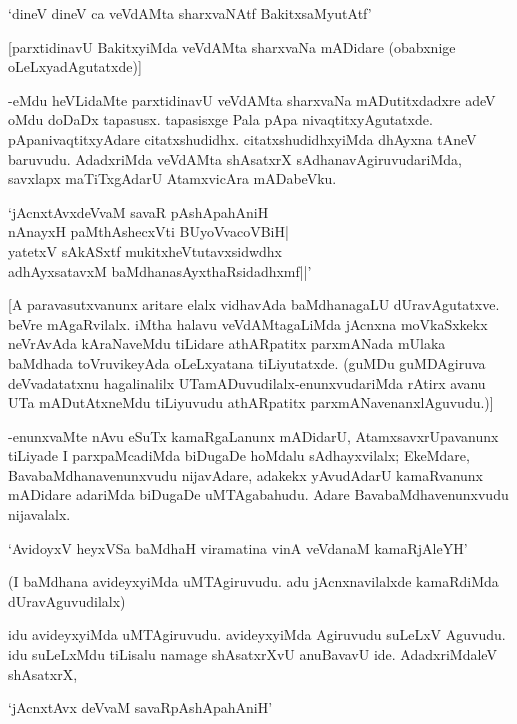 \begin{shloka}
`dineV dineV ca veVdAMta sharxvaNAtf BakitxsaMyutAtf'
\end{shloka}

[parxtidinavU BakitxyiMda veVdAMta sharxvaNa mADidare (obabxnige oLeLxyadAgutatxde)]

-eMdu heVLidaMte parxtidinavU veVdAMta sharxvaNa mADutitxdadxre adeV oMdu doDaDx tapasusx. tapasisxge Pala pApa nivaqtitxyAgutatxde. pApanivaqtitxyAdare citatxshudidhx. citatxshudidhxyiMda dhAyxna tAneV baruvudu. AdadxriMda veVdAMta shAsatxrX sAdhanavAgiruvudariMda, savxlapx maTiTxgAdarU AtamxvicAra mADabeVku.

\begin{shloka}
`jAcnxtAvxdeVvaM savaR pAshApahAniH\\
nAnayxH paMthAshecxVti BUyoVvacoVBiH|\\
yatetxV sAkASxtf mukitxheVtutavxsidwdhx\\
adhAyxsatavxM baMdhanasAyxthaRsidadhxmf||'
\end{shloka}

[A paravasutxvanunx aritare elalx vidhavAda baMdhanagaLU dUravAgutatxve. beVre mAgaRvilalx. iMtha halavu veVdAMtagaLiMda jAcnxna moVkaSxkekx neVrAvAda kAraNaveMdu tiLidare athARpatitx parxmANada mUlaka baMdhada toVruvikeyAda oLeLxyatana tiLiyutatxde. (guMDu guMDAgiruva deVvadatatxnu hagalinalilx UTamADuvudilalx-enunxvudariMda rAtirx avanu UTa mADutAtxneMdu tiLiyuvudu athARpatitx parxmANavenanxlAguvudu.)]

-enunxvaMte nAvu eSuTx kamaRgaLanunx mADidarU, AtamxsavxrUpavanunx tiLiyade I parxpaMcadiMda biDugaDe hoMdalu sAdhayxvilalx; EkeMdare, BavabaMdhanavenunxvudu nijavAdare, adakekx yAvudAdarU kamaRvanunx mADidare adariMda biDugaDe uMTAgabahudu. Adare BavabaMdhavenunxvudu nijavalalx.

\begin{shloka}
`AvidoyxV heyxVSa baMdhaH viramatina vinA veVdanaM kamaRjAleYH'
\end{shloka}

(I baMdhana avideyxyiMda uMTAgiruvudu. adu jAcnxnavilalxde kamaRdiMda dUravAguvudilalx)

idu avideyxyiMda uMTAgiruvudu. avideyxyiMda Agiruvudu suLeLxV Aguvudu. idu suLeLxMdu tiLisalu namage shAsatxrXvU anuBavavU ide. AdadxriMdaleV shAsatxrX,

\begin{shloka}
`jAcnxtAvx deVvaM savaRpAshApahAniH'
\end{shloka}

